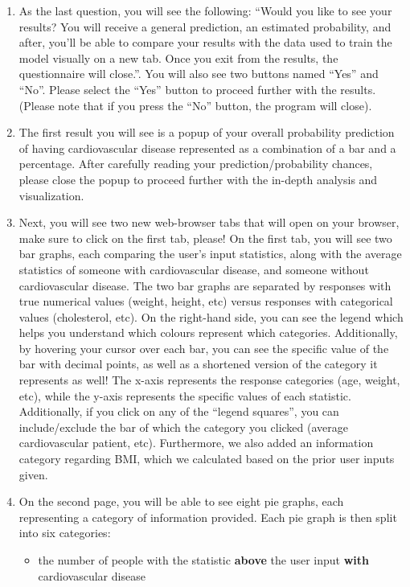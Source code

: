 ﻿\documentclass[12pt]{article}
\begin{document}
\begin{enumerate}
    \item As the last question, you will see the following: “Would you like to see your results? You will receive a general prediction, an estimated probability, and after, you’ll be able to compare your results with the data used to train the model visually on a new tab. Once you exit from the results, the questionnaire will close.”. You will also see two buttons named “Yes” and “No”. Please select the “Yes” button to proceed further with the results. 
	(Please note that if you press the “No” button, the program will close). 
    \item The first result you will see is a popup of your overall probability prediction of having cardiovascular disease represented as a combination of a bar and a percentage. After carefully reading your prediction/probability chances, please close the popup to proceed further with the in-depth analysis and visualization.
    \item Next, you will see two new web-browser tabs that will open on your browser, make sure to click on the first tab, please! On the first tab, you will see two bar graphs, each comparing the user’s input statistics, along with the average statistics of someone with cardiovascular disease, and someone without cardiovascular disease. The two bar graphs are separated by responses with true numerical values (weight, height, etc) versus responses with categorical values (cholesterol, etc). On the right-hand side, you can see the legend which helps you understand which colours represent which categories. Additionally, by hovering your cursor over each bar, you can see the specific value of the bar with decimal points, as well as a shortened version of the category it represents as well! The x-axis represents the response categories (age, weight, etc), while the y-axis represents the specific values of each statistic. Additionally, if you click on any of the “legend squares”, you can include/exclude the bar of which the category you clicked (average cardiovascular patient, etc). Furthermore, we also added an information category regarding BMI, which we calculated based on the prior user inputs given.
    \item On the second page, you will be able to see eight pie graphs, each representing a category of information provided. Each pie graph is then split into six categories: 
    \begin{itemize}
        \item the number of people with the statistic \textbf{above} the user input \textbf{with} cardiovascular disease

\end{itemize}
\end{enumerate}
\end{document}
